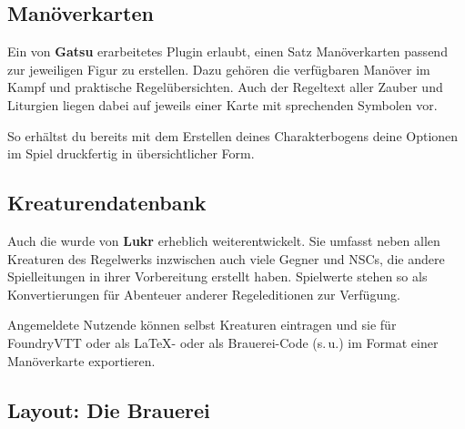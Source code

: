 


\subsection*{Manöverkarten}
Ein von \textbf{Gatsu} erarbeitetes Plugin erlaubt, einen Satz Manöverkarten passend zur jeweiligen Figur zu erstellen.
Dazu gehören die verfügbaren Manöver im Kampf und praktische Regelübersichten.
Auch der Regeltext aller Zauber und Liturgien liegen dabei auf jeweils einer Karte mit sprechenden Symbolen vor.

So erhältst du bereits mit dem Erstellen deines Charakterbogens deine Optionen im Spiel druckfertig in übersichtlicher Form.

\subsection*{Kreaturendatenbank}
Auch die  wurde von \textbf{Lukr} erheblich weiterentwickelt.
Sie umfasst neben allen Kreaturen des Regelwerks inzwischen auch viele Gegner und NSCs, die andere Spielleitungen in ihrer Vorbereitung erstellt haben.
Spielwerte stehen so als Konvertierungen für Abenteuer anderer Regeleditionen zur Verfügung.

Angemeldete Nutzende können selbst Kreaturen eintragen und sie für FoundryVTT oder als LaTeX- oder als Brauerei-Code (s.\,u.) im Format einer Manöverkarte exportieren.

%
%	
%	
%	

\subsection*{Layout: Die Brauerei}


%	
%
%
\spaltenende